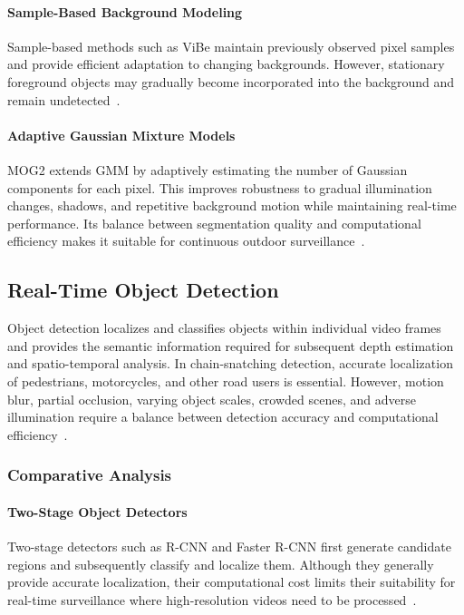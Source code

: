 \documentclass[runningheads]{llncs}
\begin{document}
\paragraph{Sample-Based Background Modeling}
Sample-based methods such as ViBe maintain previously observed pixel samples and provide efficient adaptation to changing backgrounds. However, stationary foreground objects may gradually become incorporated into the background and remain undetected~\cite{vibe}.

\paragraph{Adaptive Gaussian Mixture Models}
MOG2 extends GMM by adaptively estimating the number of Gaussian components for each pixel. This improves robustness to gradual illumination changes, shadows, and repetitive background motion while maintaining real-time performance. Its balance between segmentation quality and computational efficiency makes it suitable for continuous outdoor surveillance~\cite{zivkovic2004mog2}.


\subsection{Real-Time Object Detection}

Object detection localizes and classifies objects within individual video frames and provides the semantic information required for subsequent depth estimation and spatio-temporal analysis. In chain-snatching detection, accurate localization of pedestrians, motorcycles, and other road users is essential. However, motion blur, partial occlusion, varying object scales, crowded scenes, and adverse illumination require a balance between detection accuracy and computational efficiency~\cite{malhotra2020objectcomparison}.

\subsubsection{Comparative Analysis}

\paragraph{Two-Stage Object Detectors}
Two-stage detectors such as R-CNN and Faster R-CNN first generate candidate regions and subsequently classify and localize them. Although they generally provide accurate localization, their computational cost limits their suitability for real-time surveillance  where high-resolution videos need to be processed~\cite{fasterrcnn}.
\end{document}

